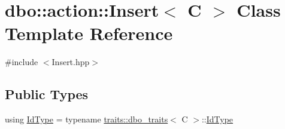 \hypertarget{classdbo_1_1action_1_1_insert}{\section{dbo\+:\+:action\+:\+:Insert$<$ C $>$ Class Template Reference}
\label{classdbo_1_1action_1_1_insert}
}


{\ttfamily \#include $<$Insert.\+hpp$>$}

\subsection*{Public Types}
\begin{DoxyCompactItemize}
\item 
using \hyperlink{classdbo_1_1action_1_1_insert_a2b184308ac0b0389ad12e64d0c5b0fbf}{Id\+Type} = typename \hyperlink{structdbo_1_1traits_1_1dbo__traits}{traits\+::dbo\+\_\+traits}$<$ C $>$\+::\hyperlink{classdbo_1_1action_1_1_insert_a2b184308ac0b0389ad12e64d0c5b0fbf}{Id\+Type}
\end{DoxyCompactItemize}
